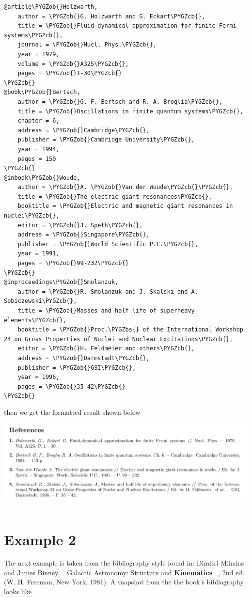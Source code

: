 \documentclass[letterpaper,10pt,english]{sphinxmanual}
\def\PYGZbs{\char`\\}
\def\PYGZob{\char`\{}
\def\PYGZcb{\char`\}}
\begin{document}
\begin{Verbatim}[commandchars=\\\{\}]
@article\PYGZob{}Holzwarth,
    author = \PYGZob{}G. Holzwarth and G. Eckart\PYGZcb{},
    title = \PYGZob{}Fluid-dynamical approximation for finite Fermi systems\PYGZcb{},
    journal = \PYGZob{}Nucl. Phys.\PYGZcb{},
    year = 1979,
    volume = \PYGZob{}A325\PYGZcb{},
    pages = \PYGZob{}1-30\PYGZcb{}
\PYGZcb{}
@book\PYGZob{}Bertsch,
    author = \PYGZob{}G. F. Bertsch and R. A. Broglia\PYGZcb{},
    title = \PYGZob{}Oscillations in finite quantum systems\PYGZcb{},
    chapter = 6,
    address = \PYGZob{}Cambridge\PYGZcb{},
    publisher = \PYGZob{}Cambridge University\PYGZcb{},
    year = 1994,
    pages = 150
\PYGZcb{}
@inbook\PYGZob{}Woude,
    author = \PYGZob{}A. \PYGZob{}Van der Woude\PYGZcb{}\PYGZcb{},
    title = \PYGZob{}The electric giant resonances\PYGZcb{},
    booktitle = \PYGZob{}Electric and magnetic giant resonances in nuclei\PYGZcb{},
    editor = \PYGZob{}J. Speth\PYGZcb{},
    address = \PYGZob{}Singapore\PYGZcb{},
    publisher = \PYGZob{}World Scientific P.C.\PYGZcb{},
    year = 1991,
    pages = \PYGZob{}99-232\PYGZcb{}
\PYGZcb{}
@inproceedings\PYGZob{}Smolanzuk,
    author = \PYGZob{}R. Smolanzuk and J. Skalski and A. Sobiczewski\PYGZcb{},
    title = \PYGZob{}Masses and half-life of superheavy elements\PYGZcb{},
    booktitle = \PYGZob{}Proc.\PYGZbs{} of the International Workshop 24 on Gross Properties of Nuclei and Nuclear Excitations\PYGZcb{},
    editor = \PYGZob{}H. Feldmeier and others\PYGZcb{},
    address = \PYGZob{}Darmstadt\PYGZcb{},
    publisher = \PYGZob{}GSI\PYGZcb{},
    year = 1996,
    pages = \PYGZob{}35-42\PYGZcb{}
\PYGZcb{}
\end{Verbatim}

then we get the formatted result shown below

\includegraphics[width=0.600\linewidth]{example1b.png}


\bigskip\hrule{}\bigskip



\section{Example 2}
\label{examples:example-2}
The next example is taken from the bibliography style found in: Dimitri Mihalas and James Binney, \_Galactic Astronomy: Structure and {\color{red}\bfseries{}Kinematics\_}, 2nd ed. (W. H. Freeman, New York, 1981). A snapshot from the the book's bibliography looks like
\end{document}
